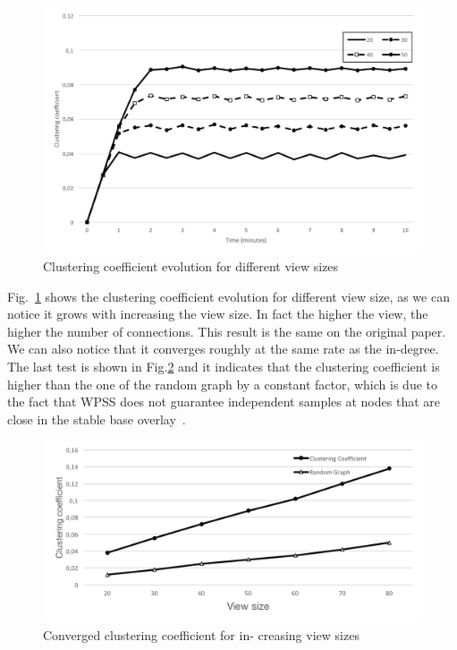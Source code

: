\begin{figure}[ht]
  \centering
  \includegraphics[keepaspectratio=true, width=\textwidth]{images/clustering_coefficient_evolution}\caption{Clustering coefficient evolution for different view sizes}
  \label{fig:clustering_coefficient_evolution}
\end{figure}

Fig.~\ref{fig:clustering_coefficient_evolution} shows the clustering coefficient evolution for different view size, as we can notice it grows with increasing the view size. In fact the higher the view, the higher the number of connections. This result is the same on the original paper. We can also notice that it converges roughly at the same rate as the in-degree.
The last test is shown in Fig.\ref{fig:converged_clustering_coefficient} and it indicates that the clustering coefficient is higher than the one of the random graph by a constant factor, which is due to the fact that WPSS does not guarantee independent samples at nodes that are close in the stable base overlay~\cite{wormhole}.

\begin{figure}[ht]
  \centering
  \includegraphics[keepaspectratio=true, width=\textwidth]{images/converged_clustering_coefficient}\caption{Converged clustering coefficient for in- creasing view sizes}
  \label{fig:converged_clustering_coefficient}
\end{figure}

